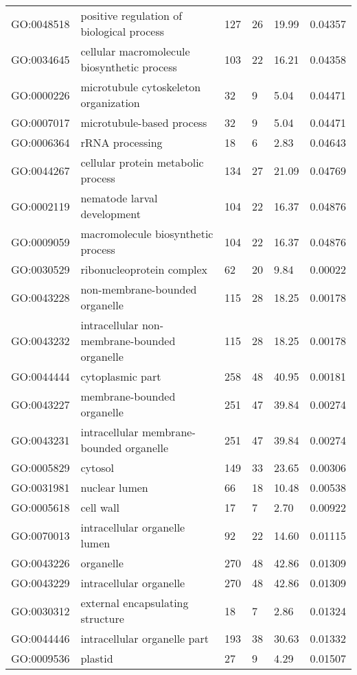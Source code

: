 \documentclass[10pt]{bmc_article}
\newenvironment{bmcformat}{\begin{raggedright}\baselineskip20pt\sloppy\setboolean{publ}{false}}{\end{raggedright}\baselineskip20pt\sloppy}
\begin{document}
\begin{bmcformat}
\begin{longtable}{lp{3cm}llll}
  GO:0048518 & positive regulation of biological process & 127 &  26 & 19.99 & 0.04357 \\ 
  GO:0034645 & cellular macromolecule biosynthetic process & 103 &  22 & 16.21 & 0.04358 \\ 
  GO:0000226 & microtubule cytoskeleton organization &  32 &   9 & 5.04 & 0.04471 \\ 
  GO:0007017 & microtubule-based process &  32 &   9 & 5.04 & 0.04471 \\ 
  GO:0006364 & rRNA processing &  18 &   6 & 2.83 & 0.04643 \\ 
  GO:0044267 & cellular protein metabolic process & 134 &  27 & 21.09 & 0.04769 \\ 
  GO:0002119 & nematode larval development & 104 &  22 & 16.37 & 0.04876 \\ 
  GO:0009059 & macromolecule biosynthetic process & 104 &  22 & 16.37 & 0.04876 \\ 
  GO:0030529 & ribonucleoprotein complex &  62 &  20 & 9.84 & 0.00022 \\ 
  GO:0043228 & non-membrane-bounded organelle & 115 &  28 & 18.25 & 0.00178 \\ 
  GO:0043232 & intracellular non-membrane-bounded organelle & 115 &  28 & 18.25 & 0.00178 \\ 
  GO:0044444 & cytoplasmic part & 258 &  48 & 40.95 & 0.00181 \\ 
  GO:0043227 & membrane-bounded organelle & 251 &  47 & 39.84 & 0.00274 \\ 
  GO:0043231 & intracellular membrane-bounded organelle & 251 &  47 & 39.84 & 0.00274 \\ 
  GO:0005829 & cytosol & 149 &  33 & 23.65 & 0.00306 \\ 
  GO:0031981 & nuclear lumen &  66 &  18 & 10.48 & 0.00538 \\ 
  GO:0005618 & cell wall &  17 &   7 & 2.70 & 0.00922 \\ 
  GO:0070013 & intracellular organelle lumen &  92 &  22 & 14.60 & 0.01115 \\ 
  GO:0043226 & organelle & 270 &  48 & 42.86 & 0.01309 \\ 
  GO:0043229 & intracellular organelle & 270 &  48 & 42.86 & 0.01309 \\ 
  GO:0030312 & external encapsulating structure &  18 &   7 & 2.86 & 0.01324 \\ 
  GO:0044446 & intracellular organelle part & 193 &  38 & 30.63 & 0.01332 \\ 
  GO:0009536 & plastid &  27 &   9 & 4.29 & 0.01507 \\ 

\end{longtable}
\end{bmcformat}
\end{document}
